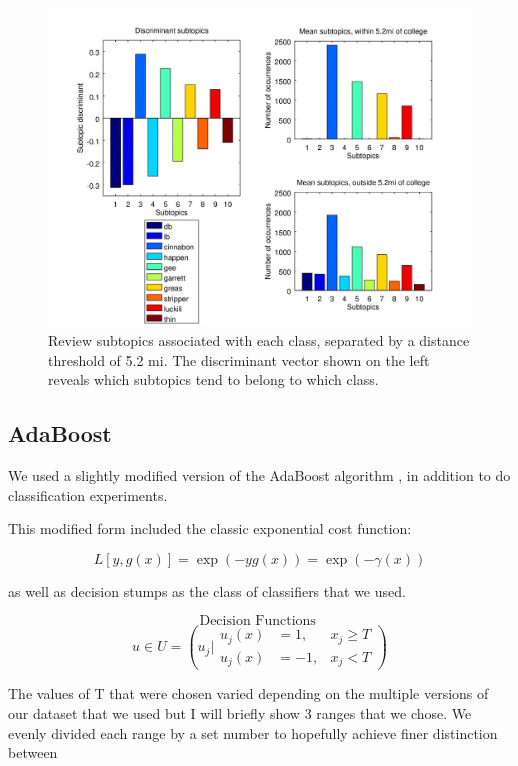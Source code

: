 \documentclass[10pt,twocolumn,letterpaper]{article}
\begin{document}
\begin{figure}[h]
  \centering{}\includegraphics[width=1\linewidth]{filtered_colleges_yes_subtopics/subtopics_discriminant}
  \caption{Review subtopics associated with each class, separated by a distance
    threshold of 5.2 mi. The discriminant vector shown on the left reveals
  which subtopics tend to belong to which class.}
\label{subtopics_discriminant}
\end{figure}

\subsection{AdaBoost}

We used a slightly modified version of the AdaBoost algorithm
\cite{Adaboost_original}, in addition to do classification experiments.

This modified form included the classic exponential cost function:

$$ L[y,g(x)] = \exp( -yg(x) ) = \exp( - \gamma(x) ) $$

as well as decision stumps as the class of classifiers that we used.

\[
  \textrm{Decision Functions }
\]
\[
  u \in U = \left( u_j |
  \begin{array}{clc}
    u_j(x) & = 1,  & x_j \geq T \\
    u_j(x) & = -1, & x_j < T
  \end{array}
\right)
\]

The values of T that were chosen varied depending on the multiple versions of
our dataset that we used but I will briefly show 3 ranges that we chose. We
evenly divided each range by a set number to hopefully achieve finer distinction
between
\end{document}
